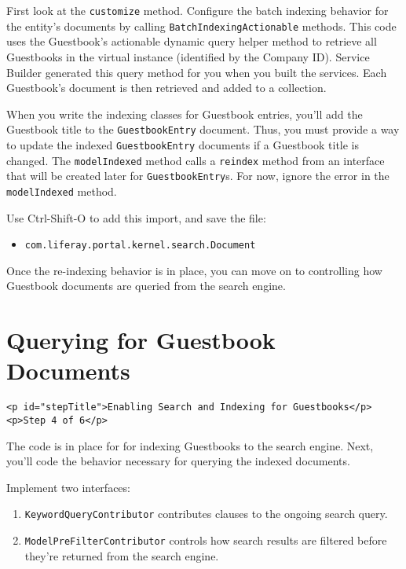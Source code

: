 First look at the \texttt{customize} method. Configure the batch
indexing behavior for the entity's documents by calling
\texttt{BatchIndexingActionable} methods. This code uses the Guestbook's
actionable dynamic query helper method to retrieve all Guestbooks in the
virtual instance (identified by the Company ID). Service Builder
generated this query method for you when you built the services. Each
Guestbook's document is then retrieved and added to a collection.

When you write the indexing classes for Guestbook entries, you'll add
the Guestbook title to the \texttt{GuestbookEntry} document. Thus, you
must provide a way to update the indexed \texttt{GuestbookEntry}
documents if a Guestbook title is changed. The \texttt{modelIndexed}
method calls a \texttt{reindex} method from an interface that will be
created later for \texttt{GuestbookEntry}s. For now, ignore the error in
the \texttt{modelIndexed} method.

Use Ctrl-Shift-O to add this import, and save the file:

\begin{itemize}
\tightlist
\item
  \texttt{com.liferay.portal.kernel.search.Document}
\end{itemize}

Once the re-indexing behavior is in place, you can move on to
controlling how Guestbook documents are queried from the search engine.

\chapter{Querying for Guestbook
Documents}\label{querying-for-guestbook-documents}

\begin{verbatim}
<p id="stepTitle">Enabling Search and Indexing for Guestbooks</p><p>Step 4 of 6</p>
\end{verbatim}

The code is in place for for indexing Guestbooks to the search engine.
Next, you'll code the behavior necessary for querying the indexed
documents.

Implement two interfaces:

\begin{enumerate}
\def\labelenumi{\arabic{enumi}.}
\item
  \texttt{KeywordQueryContributor} contributes clauses to the ongoing
  search query.
\item
  \texttt{ModelPreFilterContributor} controls how search results are
  filtered before they're returned from the search engine.
\end{enumerate}

